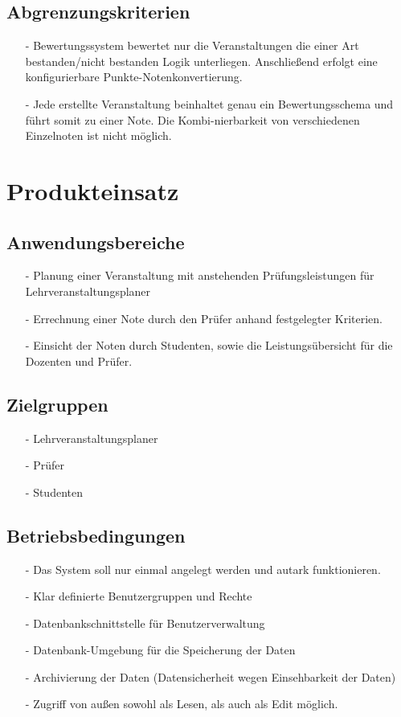 		\subsection{Abgrenzungskriterien}
		\begin{itemize}
		\item[-]	Bewertungssystem bewertet nur die Veranstaltungen die einer Art bestanden/nicht bestanden Logik unterliegen. Anschließend erfolgt eine konfigurierbare Punkte-Notenkonvertierung.
		\item[-]	Jede erstellte Veranstaltung beinhaltet genau ein Bewertungsschema und führt somit zu einer Note. Die Kombi-nierbarkeit von verschiedenen Einzelnoten ist nicht möglich.
		\end{itemize}
		
	\section{Produkteinsatz}
	
		
		\subsection{Anwendungsbereiche}
		\begin{itemize}
		\item[-]	Planung einer Veranstaltung mit anstehenden Prüfungsleistungen für Lehrveranstaltungsplaner
		\item[-]	Errechnung einer Note durch den Prüfer anhand festgelegter Kriterien.
		\item[-]	Einsicht der Noten durch Studenten, sowie die Leistungsübersicht für die Dozenten und Prüfer.
		\end{itemize}
		
		
		\subsection{Zielgruppen}
		\begin{itemize}
		\item[-]	Lehrveranstaltungsplaner
		\item[-]	Prüfer
		\item[-]	Studenten
		\end{itemize}

		\subsection{Betriebsbedingungen}
		\begin{itemize}
		\item[-]	Das System soll nur einmal angelegt werden und autark funktionieren.
		\item[-]	Klar definierte Benutzergruppen und Rechte
		\item[-]	Datenbankschnittstelle für Benutzerverwaltung
		\item[-]	Datenbank-Umgebung für die Speicherung der Daten
		\item[-]	Archivierung der Daten (Datensicherheit wegen Einsehbarkeit der Daten)
		\item[-]	Zugriff von außen sowohl als Lesen, als auch als Edit möglich. 
		\end{itemize}

